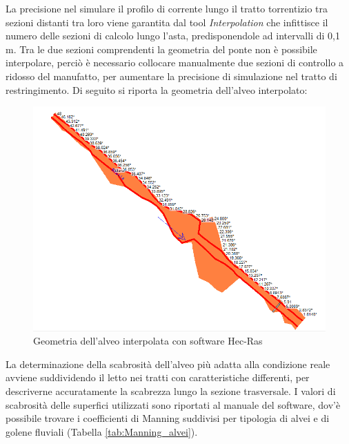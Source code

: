 \documentclass[12pt]{article} %
\begin{document}
\noindent La precisione nel simulare il profilo di corrente lungo il tratto torrentizio tra sezioni distanti tra loro viene garantita dal tool \textit{Interpolation} che infittisce il numero delle sezioni di calcolo lungo l'asta, predisponendole ad intervalli di 0,1 m. Tra le due sezioni comprendenti la geometria del ponte non è possibile interpolare, perciò è necessario collocare manualmente due sezioni di controllo a ridosso del manufatto, per aumentare la precisione di simulazione nel tratto di restringimento.
Di seguito si riporta la geometria dell'alveo interpolato:

\begin{figure}[H]
    \centering
    \includegraphics[scale=0.72]{GeometriaSturla.PNG}
    \caption{Geometria dell'alveo interpolata con software Hec-Ras}
\end{figure}

\noindent La determinazione della scabrosità dell'alveo più adatta alla condizione reale avviene suddividendo il letto nei tratti con caratteristiche differenti, per descriverne accuratamente la scabrezza lungo la sezione trasversale. I valori di scabrosità delle superfici utilizzati sono riportati al manuale del software, dov'è possibile trovare i coefficienti di Manning suddivisi per tipologia di alvei e di golene fluviali (Tabella \ref{tab:Manning_alvei}).
\end{document}
